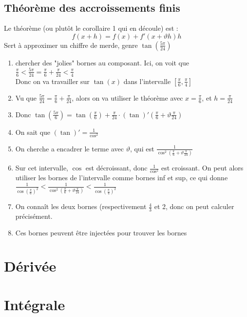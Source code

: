 \documentclass[12pt,a4paper]{article}
\begin{document}
\subsection{Théorème des accroissements finis}
Le théorème (ou plutôt le corollaire 1 qui en découle) est : 
\begin{equation*}
	f(x+h) = f(x) + f'(x+\vartheta h)h
\end{equation*}
Sert à approximer un chiffre de merde, genre $\tan\left(\frac{5\pi}{24}\right)$
\begin{enumerate}[label=\roman*.]
	\item chercher des "jolies" bornes au composant. Ici, on voit que \\
	$\frac{\pi}{6} < \frac{5\pi}{24} = \frac{\pi}{6} + \frac{\pi}{24} < \frac{\pi}{4}$\\
	Donc on va travailler sur $\tan(x)$ dans l'intervalle $[\frac{\pi}{6}, \frac{\pi}{4}]$
	\item Vu que $\frac{5\pi}{24} = \frac{\pi}{6} + \frac{\pi}{24}$, alors on va utiliser le théorème avec $x = \frac{\pi}{6}$, et $h =\frac{\pi}{24}$
	\item Donc $\tan\left(\frac{5\pi}{6}\right) = \tan(\frac{\pi}{6}) + \frac{\pi}{24}\cdot (\tan)'(\frac{\pi}{6} + \vartheta\frac{\pi}{24})$
	\item On sait que $(\tan)' = \frac{1}{\cos^2}$
	\item On cherche a encadrer le terme avec $\vartheta$, qui est $\frac{1}{\cos^2(\frac{\pi}{6} + \vartheta\frac{\pi}{24})}$
	\item Sur cet intervalle, $\cos$ est décroissant, donc $\frac{1}{\cos^2}$ est croissant. On peut alors utiliser les bornes de l'intervalle comme bornes inf et sup, ce qui donne \\
	$\frac{1}{\cos(\frac{\pi}{6})^2} < \frac{1}{\cos^2(\frac{\pi}{6} + \vartheta\frac{\pi}{24})} < \frac{1}{\cos(\frac{\pi}{4})^2}$
	\item On connaît les deux bornes (respectivement $\frac{4}{3}$ et 2, donc on peut calculer précisément.
	\item Ces bornes peuvent être injectées pour trouver les bornes 
\end{enumerate}
\section{Dérivée}
\section{Intégrale}
\end{document}
